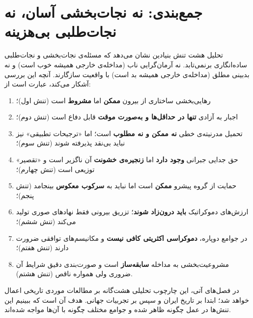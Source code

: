 \section{جمع‌بندی: نه نجات‌بخشی آسان، نه نجات‌طلبی بی‌هزینه}
\label{sec:ch02-conclusion}

تحلیل هشت تنش بنیادین نشان می‌دهد که مسئله‌ی نجات‌بخشی و نجات‌طلبی
ساده‌انگاری برنمی‌تابد. نه آرمان‌گرایی ناب (مداخله‌ی خارجی
همیشه خوب است) و نه بدبینی مطلق (مداخله‌ی خارجی همیشه بد است)
با واقعیت سازگارند. آنچه این بررسی آشکار می‌کند، عبارت است از:

\begin{enumerate}[label=\textbf{\arabic*.}, nosep, rightmargin=1em]
	\item رهایی‌بخشی ساختاری از بیرون \textbf{ممکن} اما
	\textbf{مشروط} است (تنش اول)؛
	\item اجبار به آزادی \textbf{تنها در حداقل‌ها و به‌صورت موقت}
	قابل دفاع است (تنش دوم)؛
	\item تحمیل مدرنیته‌ی خطی \textbf{نه ممکن و نه مطلوب} است؛
	اما «ترجیحات تطبیقی» نیز نباید بی‌نقد پذیرفته شوند
	(تنش سوم)؛
	\item حق جدایی جبرانی \textbf{وجود دارد} اما
	\textbf{زنجیره‌ی خشونت} آن ناگزیر است و «تقصیر» توزیعی
	است (تنش چهارم)؛
	\item حمایت از گروه پیشرو \textbf{ممکن} است اما نباید به
	\textbf{سرکوب معکوس} بینجامد (تنش پنجم)؛
	\item ارزش‌های دموکراتیک \textbf{باید درون‌زاد شوند}؛ تزریق
	بیرونی فقط نهادهای صوری تولید می‌کند (تنش ششم)؛
	\item در جوامع دوپاره، \textbf{دموکراسی اکثریتی کافی نیست}
	و مکانیسم‌های توافقی ضرورت دارند (تنش هفتم)؛
	\item مشروعیت‌بخشی به مداخله \textbf{سابقه‌ساز} است و
	صورت‌بندی دقیق شرایط آن ضروری ولی همواره ناقص
	(تنش هشتم).
\end{enumerate}

در فصل‌های آتی، این چارچوب تحلیلی هشت‌گانه بر مطالعات موردی
تاریخی اعمال خواهد شد؛ ابتدا بر تاریخ ایران و سپس بر
تجربیات جهانی. هدف آن است که ببینیم این تنش‌ها در عمل چگونه
ظاهر شده و جوامع مختلف چگونه با آن‌ها مواجه شده‌اند.